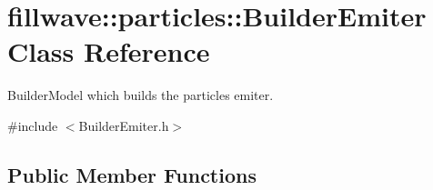 \hypertarget{classfillwave_1_1particles_1_1BuilderEmiter}{}\section{fillwave\+:\+:particles\+:\+:Builder\+Emiter Class Reference}
\label{classfillwave_1_1particles_1_1BuilderEmiter}


Builder\+Model which builds the particles emiter.  




{\ttfamily \#include $<$Builder\+Emiter.\+h$>$}

\subsection*{Public Member Functions}
